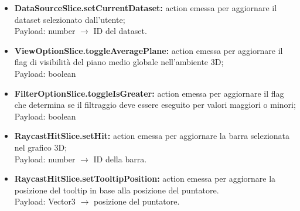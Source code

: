 \begin{itemize}
    \item \textbf{DataSourceSlice.setCurrentDataset:} action emessa per aggiornare il dataset selezionato dall'utente; \\ Payload: number $\rightarrow$ ID del dataset.
    \item \textbf{ViewOptionSlice.toggleAveragePlane:} action emessa per aggiornare il flag di visibilità del piano medio globale nell'ambiente 3D; \\ Payload: boolean
    \item \textbf{FilterOptionSlice.toggleIsGreater:} action emessa per aggiornare il flag che determina se il filtraggio deve essere eseguito per valori maggiori o minori; \\ Payload: boolean
    \item \textbf{RaycastHitSlice.setHit:} action emessa per aggiornare la barra selezionata nel grafico 3D; \\ Payload: number $\rightarrow$ ID della barra.
    \item \textbf{RaycastHitSlice.setTooltipPosition:} action emessa per aggiornare la posizione del tooltip in base alla posizione del puntatore.\\ Payload: Vector3 $\rightarrow$ posizione del puntatore.
\end{itemize}
